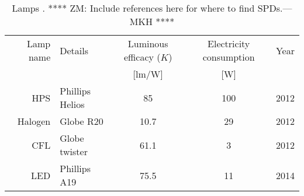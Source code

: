 

\begin{table}
\centering %
\caption{Lamps  \cite{aube2013}. **** ZM: Include references here for where to find SPDs.---MKH ****}
\begin{tabular}{r l c c c}
  \toprule
  Lamp name 
      & Details 
      & Luminous efficacy ($K$)  
      & Electricity consumption 
      & Year  \\
  
      &
      & [lm/W]
      & [W] 
      & \\
  \midrule
  HPS   
      & Phillips Helios
      & 85
      & 100
      & 2012 \\
  Halogen
      & Globe R20
      & 10.7
      & 29
      & 2012\\
  CFL
      & Globe twister
      & 61.1
      & 3 
      & 2012 \\
  LED
      & Phillips A19
      & 75.5
      & 11 
      & 2014 \\
  \bottomrule
\end{tabular}
\label{tab:lamps}
\end{table}

